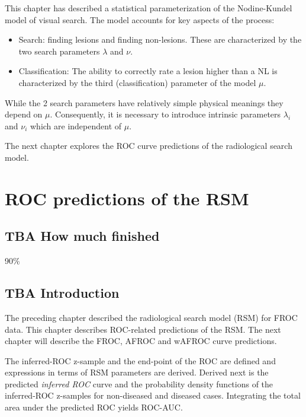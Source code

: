 \documentclass[
]{book}
\providecommand{\tightlist}{%
  \setlength{\itemsep}{0pt}\setlength{\parskip}{0pt}}
\begin{document}
This chapter has described a statistical parameterization of the Nodine-Kundel model of visual search. The model accounts for key aspects of the process:

\begin{itemize}
\tightlist
\item
  Search: finding lesions and finding non-lesions. These are characterized by the two search parameters \(\lambda\) and \(\nu\).
\item
  Classification: The ability to correctly rate a lesion higher than a NL is characterized by the third (classification) parameter of the model \(\mu\).
\end{itemize}

While the 2 search parameters have relatively simple physical meanings they depend on \(\mu\). Consequently, it is necessary to introduce intrinsic parameters \(\lambda_i\) and \(\nu_i\) which are independent of \(\mu\).

The next chapter explores the ROC curve predictions of the radiological search model.

\hypertarget{rsm-predictions}{%
\chapter{ROC predictions of the RSM}\label{rsm-predictions}}

\hypertarget{rsm-predictions-how-much-finished}{%
\section{TBA How much finished}\label{rsm-predictions-how-much-finished}}

90\%

\hypertarget{rsm-predictions-intro}{%
\section{TBA Introduction}\label{rsm-predictions-intro}}

The preceding chapter described the radiological search model (RSM) for FROC data. This chapter describes ROC-related predictions of the RSM. The next chapter will describe the FROC, AFROC and wAFROC curve predictions.

The inferred-ROC z-sample and the end-point of the ROC are defined and expressions in terms of RSM parameters are derived. Derived next is the predicted \emph{inferred ROC} curve and the probability density functions of the inferred-ROC z-samples for non-diseased and diseased cases. Integrating the total area under the predicted ROC yields ROC-AUC.
\end{document}
